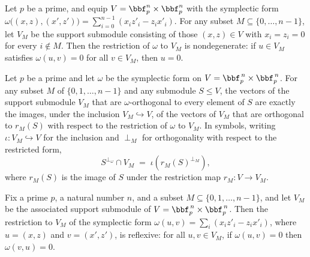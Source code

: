 \begin{lemma}
\label{sym_form_sub_nondegenerate}
\leanok
{}
Let $p$ be a prime, and equip $V = \bbf_p^n \times \bbf_p^n$ with the symplectic form
$\omega\big((x,z),(x',z')\big) = \sum_{i=0}^{n-1}(x_i z'_i - z_i x'_i)$. For any subset
$M \subseteq \{0,\dots,n-1\}$, let $V_M$ be the support submodule consisting of those
$(x,z) \in V$ with $x_i = z_i = 0$ for every $i \notin M$. Then the restriction of
$\omega$ to $V_M$ is nondegenerate: if $u \in V_M$ satisfies $\omega(u,v) = 0$ for all
$v \in V_M$, then $u = 0$.
\end{lemma}

\begin{lemma}
\label{orth_inter_eq_orth_sub_image}
\leanok
{}
Let $p$ be a prime and let $\omega$ be the symplectic form on $V = \bbf_p^{\,n} \times
\bbf_p^{\,n}$. For any subset $M$ of $\{0, 1, \dots, n-1\}$ and any submodule $S \le V$,
the vectors of the support submodule $V_M$ that are $\omega$-orthogonal to every element
of $S$ are exactly the images, under the inclusion $V_M \hookrightarrow V$, of the
vectors of $V_M$ that are orthogonal to $r_M(S)$ with respect to the restriction of
$\omega$ to $V_M$. In symbols, writing $\iota \colon V_M \hookrightarrow V$ for the
inclusion and $\perp_M$ for orthogonality with respect to the restricted form,
\[
S^{\perp_\omega} \cap V_M \;=\; \iota\!\left( r_M(S)^{\perp_M} \right),
\]
where $r_M(S)$ is the image of $S$ under the restriction map $r_M \colon V \to V_M$.
\end{lemma}

\begin{lemma}
\label{sym_form_sub_isRefl}
\leanok
{}
Fix a prime $p$, a natural number $n$, and a subset $M \subseteq \{0,1,\dots,n-1\}$, and
let $V_M$ be the associated support submodule of $V = \bbf_p^{\,n} \times \bbf_p^{\,n}$.
Then the restriction to $V_M$ of the symplectic form $\omega(u,v) = \sum_{i} (x_i z'_i -
z_i x'_i)$, where $u=(x,z)$ and $v=(x',z')$, is reflexive: for all $u, v \in V_M$, if
$\omega(u,v) = 0$ then $\omega(v,u) = 0$.
\end{lemma}

